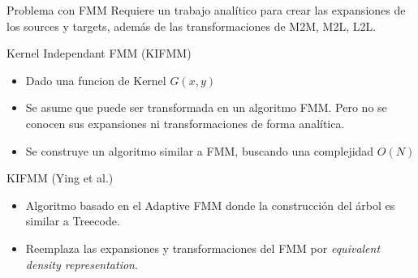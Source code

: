 \documentclass{beamer}
\begin{document}
\begin{frame}{Problema con FMM}
Requiere un trabajo analítico para crear las expansiones de los sources y targets, además de las transformaciones de M2M, M2L, L2L.
\end{frame}

\begin{frame}{Kernel Independant FMM (KIFMM)}
\begin{itemize}
    \item Dado una funcion de Kernel $G(x,y)$
    \item Se asume que puede ser transformada en un algoritmo FMM. Pero no se conocen sus expansiones ni transformaciones de forma analítica.
    \item Se construye un algoritmo similar a FMM, buscando una complejidad $O(N)$
\end{itemize}
\end{frame}

\begin{frame}{KIFMM (Ying et al.)}
\begin{itemize}
    \item Algoritmo basado en el Adaptive FMM donde la construcción del árbol es similar a Treecode.
    \item Reemplaza las expansiones y transformaciones del FMM por \textit{equivalent density representation}.
\end{itemize}
\end{frame}
\end{document}
